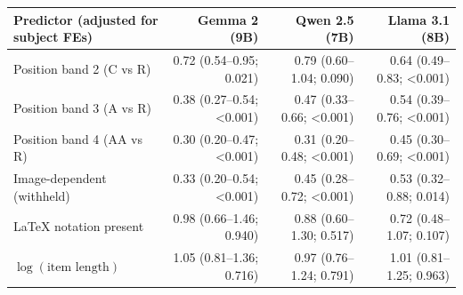 \begin{tabular}{@{}lrrr@{}}
\toprule
Predictor (adjusted for subject FEs) & Gemma 2 (9B) & Qwen 2.5 (7B) & Llama 3.1 (8B) \\
\midrule
Position band 2 (C vs R) & 0.72 (0.54--0.95; 0.021) & 0.79 (0.60--1.04; 0.090) & 0.64 (0.49--0.83; <0.001) \\
Position band 3 (A vs R) & 0.38 (0.27--0.54; <0.001) & 0.47 (0.33--0.66; <0.001) & 0.54 (0.39--0.76; <0.001) \\
Position band 4 (AA vs R) & 0.30 (0.20--0.47; <0.001) & 0.31 (0.20--0.48; <0.001) & 0.45 (0.30--0.69; <0.001) \\
Image-dependent (withheld) & 0.33 (0.20--0.54; <0.001) & 0.45 (0.28--0.72; <0.001) & 0.53 (0.32--0.88; 0.014) \\
LaTeX notation present & 0.98 (0.66--1.46; 0.940) & 0.88 (0.60--1.30; 0.517) & 0.72 (0.48--1.07; 0.107) \\
$\log(\text{item length})$ & 1.05 (0.81--1.36; 0.716) & 0.97 (0.76--1.24; 0.791) & 1.01 (0.81--1.25; 0.963) \\
\bottomrule
\end{tabular}
